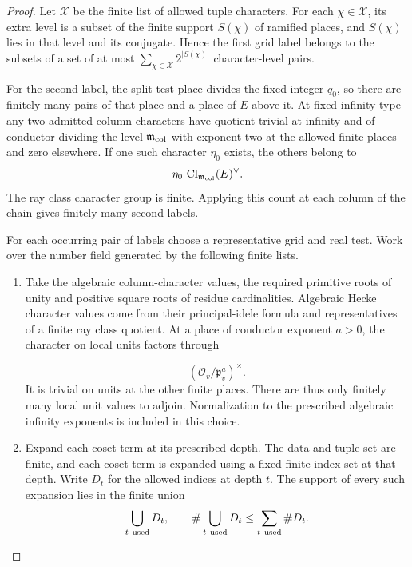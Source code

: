 \begin{proof}

Let \(\mathcal X\) be the finite list of allowed tuple
characters. For each \(\chi\in\mathcal X\), its extra
level is a subset of the finite support \(S(\chi)\) of
ramified places, and \(S(\chi)\) lies in that level and
its conjugate. Hence the first grid label belongs to
the subsets of a set of at most
\(\sum_{\chi\in\mathcal X}2^{|S(\chi)|}\) character-level pairs.

For the second label, the split test place divides the fixed
integer \(q_0\), so there are finitely many pairs of that place
and a place of \(E\) above it. At fixed infinity type any two
admitted column characters have quotient trivial at infinity
and of conductor dividing the level \(\mathfrak m_{\rm col}\)
with exponent two at the allowed finite places and zero
elsewhere. If one such character \(\eta_0\) exists, the
others belong to
\[
       \eta_0\,\operatorname{Cl}_{\mathfrak m_{\rm col}}(E)^\vee.
\]
The ray class character group is finite. Applying this count
at each column of the chain gives finitely many second labels.


For each occurring pair of labels choose a representative grid
and real test. Work over the number field generated by the
following finite lists.

\begin{enumerate}
\item Take the algebraic column-character values, the required
primitive roots of unity and positive square roots of residue
cardinalities. Algebraic Hecke character values come from
their principal-idele formula and representatives of a finite
ray class quotient. At a place of conductor exponent \(a>0\),
the character on local units factors through

\[
  (\mathcal O_v/\mathfrak p_v^a)^\times.
\]
 It is trivial on
units at the other finite places. There are thus only finitely
many local unit values to adjoin. Normalization to the
prescribed algebraic infinity exponents is included in this choice.
\item Expand each coset term at its prescribed depth. The data
and tuple set are finite, and each coset term is expanded using
a fixed finite index set at that depth. Write \(D_t\) for the allowed indices at depth \(t\). The support of every such expansion lies in the finite union
\[
  \bigcup_{t\ {\rm used}}D_t,\qquad \#\bigcup_{t\ {\rm used}}D_t\le\sum_{t\ {\rm used}}\# D_t .
\]


\end{enumerate}
\end{proof}
